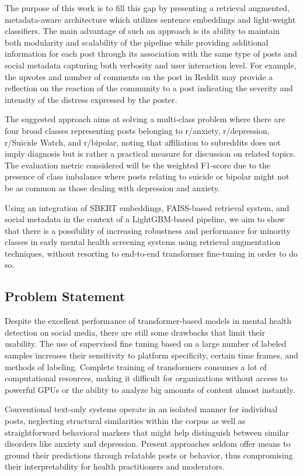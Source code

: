 \documentclass[11pt]{article}
\begin{document}
The purpose of this work is to fill this gap by presenting a retrieval augmented, metadata-aware architecture which utilizes sentence embeddings and light-weight classifiers. The main advantage of such an approach is its ability to maintain both modularity and scalability of the pipeline while providing additional information for each post through its association with the same type of posts and social metadata capturing both verbosity and user interaction level. For example, the upvotes and number of comments on the post in Reddit may provide a reflection on the reaction of the community to a post indicating the severity and intensity of the distress expressed by the poster.

The suggested approach aims at solving a multi-class problem where there are four broad classes representing posts belonging to r/anxiety, r/depression, r/Suicide Watch, and r/bipolar, noting that affiliation to subreddits does not imply diagnosis but is rather a practical measure for discussion on related topics. The evaluation metric considered will be the weighted F1-score due to the presence of class imbalance where posts relating to suicide or bipolar might not be as common as those dealing with depression and anxiety.

Using an integration of SBERT embeddings, FAISS-based retrieval system, and social metadata in the context of a LightGBM-based pipeline, we aim to show that there is a possibility of increasing robustness and performance for minority classes in early mental health screening systems using retrieval augmentation techniques, without resorting to end-to-end transformer fine-tuning in order to do so.

\subsection{Problem Statement}

Despite the excellent performance of transformer-based models in mental health detection on social media, there are still some drawbacks that limit their usability. The use of supervised fine tuning based on a large number of labeled samples increases their sensitivity to platform specificity, certain time frames, and methods of labeling. Complete training of transformers consumes a lot of computational resources, making it difficult for organizations without access to powerful GPUs or the ability to analyze big amounts of content almost instantly.

Conventional text-only systems operate in an isolated manner for individual posts, neglecting structural similarities within the corpus as well as straightforward behavioral markers that might help distinguish between similar disorders like anxiety and depression. Present approaches seldom offer means to ground their predictions through relatable posts or behavior, thus compromising their interpretability for health practitioners and moderators.
\end{document}

